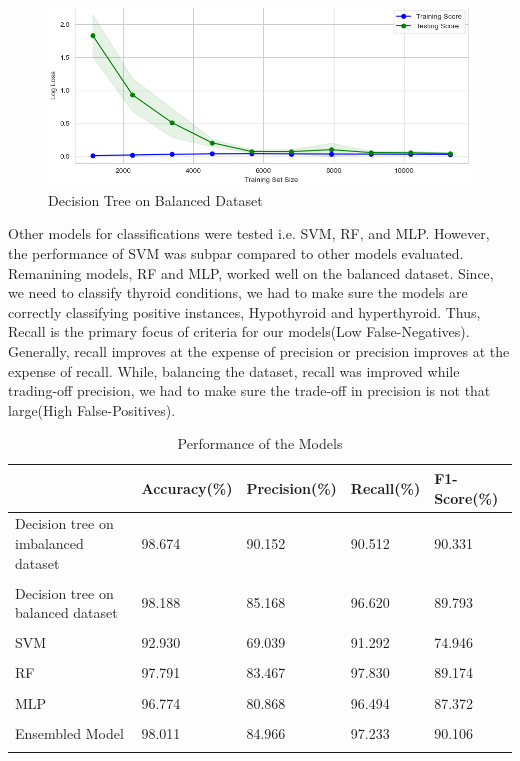 \begin{figure}
\centering
\includegraphics[scale=0.5]{learn.png}
\caption{Decision Tree on Balanced Dataset}
\end{figure} \par
Other models for classifications were tested i.e. SVM, RF, and MLP. However, the performance of SVM was subpar compared to other models evaluated. Remanining models, RF and MLP, worked well on the balanced dataset. Since, we need to classify thyroid conditions, we had to make sure the models are correctly classifying positive instances, Hypothyroid and hyperthyroid. Thus, Recall is the primary focus of criteria for our models(Low False-Negatives). Generally, recall improves at the expense of precision or precision improves at the expense of recall\cite{gordon1989recall}. While, balancing the dataset, recall was improved while trading-off precision, we had to make sure the trade-off in precision is not that large(High False-Positives).
\\
\begin{table}[h]
\caption{Performance of the Models}
\begin{tabular}{p{3.5cm} p{2cm} p{2cm} p{2cm} p{2cm}}
\hline
 & Accuracy(\%) & Precision(\%) & Recall(\%) & F1-Score(\%) \\
\hline
Decision tree on imbalanced dataset & 98.674 & 90.152 & 90.512 & 90.331 \\\\
Decision tree on balanced dataset & 98.188 & 85.168 & 96.620 & 89.793 \\\\
SVM & 92.930 & 69.039 & 91.292 & 74.946 \\\\
RF & 97.791 & 83.467 & 97.830 & 89.174 \\\\
MLP & 96.774 & 80.868 & 96.494 & 87.372 \\\\
Ensembled Model & 98.011 & 84.966 & 97.233 & 90.106 \\\\
\hline
\end{tabular}
\end{table}

